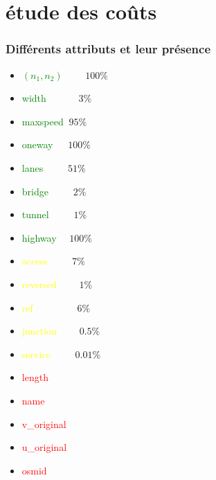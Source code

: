 \documentclass[aspectratio=169]{beamer}
\begin{document}
    \section{étude des coûts}
    \begin{frame}
        \frametitle{Différents attributs et leur présence}
        \begin{multicols}{2}
            \begin{itemize}
                \item \textcolor{green}{$(n_1, n_2)$} $\qquad 100\%$
                \item \textcolor{green}{width} $\qquad\quad 3\%$ 
                \item \textcolor{green}{maxspeed} $\ 95\%$
                \item \textcolor{green}{oneway} $\quad\ 100\%$
                \item \textcolor{green}{lanes} $\qquad\ 51\%$
                \item \textcolor{green}{bridge} $\qquad\ 2\%$
                \item \textcolor{green}{tunnel} $\qquad\ 1\%$
                \item \textcolor{green}{highway} $\quad 100\%$
                \item \textcolor{yellow}{access}  $\qquad\ 7\%$
            \end{itemize}
            \vfill\null
            \columnbreak
            \begin{itemize}
                \item \textcolor{yellow}{reversed} $\qquad 1\%$
                \item \textcolor{yellow}{ref} $\qquad\qquad\ 6\%$
                \item \textcolor{yellow}{junction} $\qquad 0.5\%$
                \item \textcolor{yellow}{service} $\qquad\ 0.01\%$
                \item \textcolor{red}{length}
                \item \textcolor{red}{name}
                \item \textcolor{red}{v\_original}
                \item \textcolor{red}{u\_original}
                \item \textcolor{red}{osmid}
            \end{itemize}
            \vfill\null
        \end{multicols}
    \end{frame}
\end{document}
